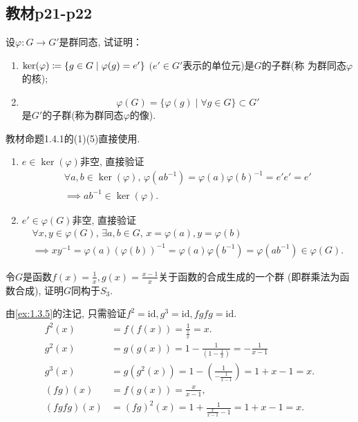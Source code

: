 \subsection{教材p21-p22}

\begin{problem}\label{ex:1.4.1}
    设$\varphi:G \to G'$是群同态, 试证明：
\begin{enumerate}[(1)]
    \item $\ker(\varphi) \mathrel{\coloneqq} \{g \in G \mid \varphi(g) = e'\}$ $(e' \in G'$表示的单位元)是$G$的子群(称
为群同态$\varphi$的核);
    \item \[\varphi(G) = \{\varphi(g) \mid \forall g \in G\} \subset G'\]
是$G'$的子群(称为群同态$\varphi$的像).
\end{enumerate}
\end{problem}

\begin{solution}
    教材命题1.4.1的(1)(5)直接使用.
\begin{enumerate}[(1)]
    \item $e \in \ker(\varphi)$非空, 直接验证\[
    \begin{gathered}
        \forall a, b \in \ker(\varphi),\, \varphi(ab^{-1}) = \varphi(a)\varphi(b)^{-1} = e'e' = e'\\
        \implies ab^{-1} \in \ker(\varphi).
    \end{gathered}
    \]
    \item $e' \in \varphi(G)$非空, 直接验证\[
    \begin{gathered}
        \forall x, y \in \varphi(G),\, \exists a, b \in G,\, x = \varphi(a), y = \varphi(b)\\
        \implies xy^{-1} = \varphi(a)(\varphi(b))^{-1} = \varphi(a)\varphi(b^{-1}) = \varphi(ab^{-1}) \in \varphi(G).
    \end{gathered}
    \]
\end{enumerate}
\end{solution}

\begin{problem}
    令$G$是函数$f(x) = \frac1x, g(x) = \frac{x-1}x$关于函数的合成生成的一个群
(即群乘法为函数合成), 证明$G$同构于$S_3$.
\end{problem}

\begin{solution}
    由\ref{ex:1.3.5}的注记, 只需验证$f^2 = \mathrm{id}, g^3 = \mathrm{id}, fgfg = \mathrm{id}$.
\[
\begin{aligned}
    f^2(x) &= f(f(x)) = \frac{1}{\frac{1}{x}} = x.\\
    g^2(x) &= g(g(x)) = 1 - \frac{1}{(1 - \frac{1}{x})} = -\frac{1}{x - 1}\\
    g^3(x) &= g(g^2(x)) = 1 - (\frac{1}{-\frac{1}{x - 1}}) = 1 + x - 1 = x.\\
    (fg)(x) &= f(g(x)) = \frac{x}{x - 1},\\
    (fgfg)(x) &= (fg)^2(x) = 1 + \frac{1}{\frac{x}{x - 1} - 1} = 1 + x - 1 = x.
\end{aligned}
\]

\end{solution}


